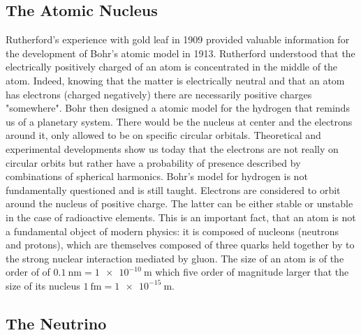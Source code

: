 \subsection{The Atomic Nucleus}

Rutherford's experience with gold leaf in 1909 provided valuable information for the development of Bohr's atomic model in 1913. Rutherford understood that the electrically positively charged of an atom is concentrated in the middle of the atom. Indeed, knowing that the matter is electrically neutral and that an atom has electrons (charged negatively) there are necessarily positive charges "somewhere". Bohr then designed a atomic model for the hydrogen that reminds us of a planetary system. There would be the nucleus at center and the electrons around it, only allowed to be on specific circular orbitals.
Theoretical and experimental developments show us today that the electrons are not really on circular orbits but rather have a probability of presence described by combinations of spherical harmonics. Bohr's model for hydrogen is not fundamentally questioned and is still taught. Electrons are considered to orbit around the nucleus of positive charge. The latter can be either stable or unstable in the case of radioactive elements. 
This is an important fact, that an atom is not a fundamental object of modern physics: it is composed of nucleons (neutrons and protons), which are themselves composed of three quarks held together by to the strong nuclear interaction mediated by gluon. The size of an atom is of the order of of $\SI{0.1}{\nano\m} = \SI{1e-10}{\m}$ which five order of magnitude larger that the size of its nucleus $\SI{1}{\femto\m} = \SI{1e-15}{\m}$.


\subsection{The Neutrino}

